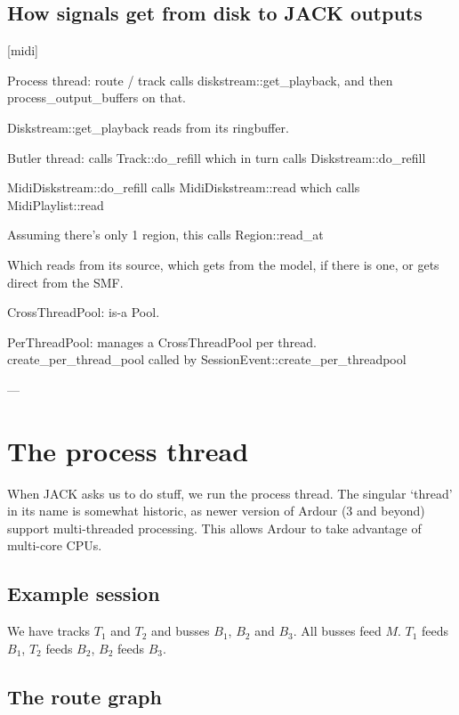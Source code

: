 \documentclass[10pt,a4paper]{book}
\begin{document}
\section{How signals get from disk to JACK outputs}

[midi]

Process thread: route / track calls diskstream::get\_playback, and then process\_output\_buffers on that.

Diskstream::get\_playback reads from its ringbuffer.


Butler thread: calls Track::do\_refill which in turn calls Diskstream::do\_refill

MidiDiskstream::do\_refill calls MidiDiskstream::read which calls MidiPlaylist::read

Assuming there's only 1 region, this calls Region::read\_at

Which reads from its source, which gets from the model, if there is one, or gets direct from the SMF.




CrossThreadPool: is-a Pool.

PerThreadPool: manages a CrossThreadPool per thread.  create\_per\_thread\_pool
called by SessionEvent::create\_per\_thread\-pool

---



\chapter{The process thread}

When JACK asks us to do stuff, we run the process thread.  The
singular `thread' in its name is somewhat historic, as newer version
of Ardour (3 and beyond) support multi-threaded processing.  This
allows Ardour to take advantage of multi-core CPUs.

\section{Example session}

We have tracks $T_1$ and $T_2$ and busses $B_1$, $B_2$ and $B_3$.  All
busses feed $M$.  $T_1$ feeds $B_1$, $T_2$ feeds $B_2$, $B_2$ feeds
$B_3$.


\section{The route graph}
\end{document}
